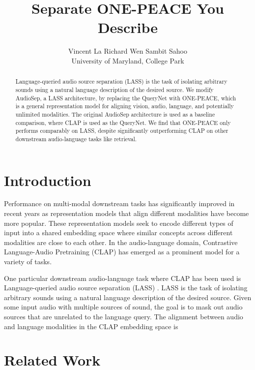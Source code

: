 \documentclass[11pt]{article}
\title{Separate ONE-PEACE You Describe}
\author{Vincent La \quad Richard Wen \quad Sambit Sahoo \\
        University of Maryland, College Park}
\begin{document}
\maketitle

\begin{abstract}

Language-queried audio source separation (LASS) is the task of isolating arbitrary sounds using a natural language description of the desired source. We modify AudioSep, a LASS architecture, by replacing the QueryNet with ONE-PEACE, which is a general representation model for aligning vision, audio, language, and potentially unlimited modalities. The original AudioSep architecture is used as a baseline comparison, where CLAP is used as the QueryNet. We find that ONE-PEACE only performs comparably on LASS, despite significantly outperforming CLAP on other downstream audio-language tasks like retrieval.

\end{abstract}

\section{Introduction}
Performance on multi-modal downstream tasks has significantly improved in recent years as representation models that align different modalities have become more popular. These representation models seek to encode different types of input into a shared embedding space where similar concepts across different modalities are close to each other. In the audio-language domain, Contrastive Language-Audio Pretraining (CLAP) \cite{clap} has emerged as a prominent model for a variety of tasks.

One particular downstream audio-language task where CLAP has been used is Language-queried audio source separation (LASS) \cite{lass}. LASS is the task of isolating arbitrary sounds using a natural language description of the desired source. Given some input audio with multiple sources of sound, the goal is to mask out audio sources that are unrelated to the language query. The alignment between audio and language modalities in the CLAP embedding space is 

\section{Related Work}
\end{document}
